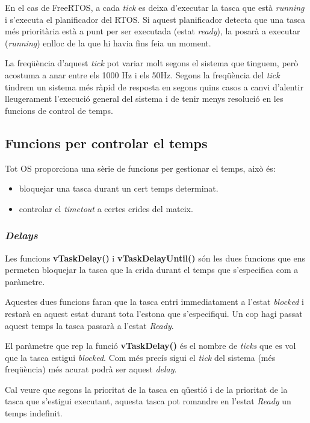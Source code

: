 En el cas de FreeRTOS, a cada {\em tick} es deixa d'executar la tasca que està {\em running} i s'executa el planificador del RTOS. Si aquest planificador detecta que una tasca més prioritària està a punt per ser executada (estat {\em ready}), la posarà a executar ({\em running}) enlloc de la que hi havia fins feia un moment.

La freqüència d'aquest {\em tick} pot variar molt segons el sistema que tinguem, però acostuma a anar entre els 1000 Hz i els 50Hz. Segons la freqüència del {\em tick} tindrem un sistema més ràpid de resposta en segons quins casos a canvi d'alentir lleugerament l'execució general del sistema i de tenir menys resolució en les funcions de control de temps.

\subsection{Funcions per controlar el temps}

Tot OS proporciona una sèrie de funcions per gestionar el temps, això és:
\begin{itemize}
 \item bloquejar una tasca durant un cert temps determinat.
 \item controlar el {\em timetout} a certes crides del mateix.
\end{itemize}

\subsubsection{\em Delays}
Les funcions {\bf vTaskDelay()} i {\bf vTaskDelayUntil()} són les dues funcions que ens permeten bloquejar la tasca que la crida durant el temps que s'especifica com a paràmetre.

Aquestes dues funcions faran que la tasca entri immediatament a l'estat {\em blocked} i restarà en aquest estat durant tota l'estona que s'especifiqui. Un cop hagi passat aquest temps la tasca passarà a l'estat {\em Ready}.

El paràmetre que rep la funció {\bf vTaskDelay()} és el nombre de {\em ticks} que es vol que la tasca estigui {\em blocked}. Com més precís sigui el {\em tick} del sistema (més freqüència) més acurat podrà ser aquest {\em delay}.

Cal veure que segons la prioritat de la tasca en qüestió i de la prioritat de la tasca que s'estigui executant, aquesta tasca pot romandre en l'estat {\em Ready} un temps indefinit.

